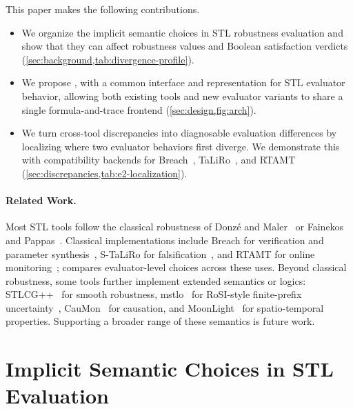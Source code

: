 This paper makes the following contributions.
\begin{itemize}
  \item We organize the implicit semantic choices in STL robustness
    evaluation and show that they can affect robustness values and Boolean satisfaction verdicts (\cref{sec:background,tab:divergence-profile}).
  \item We propose \tool, with a common interface and representation for STL evaluator behavior, allowing both existing tools and new evaluator variants to share a single formula-and-trace frontend (\cref{sec:design,fig:arch}).
  \item We turn cross-tool discrepancies into diagnosable evaluation differences by localizing
  where two evaluator behaviors first diverge.
  We demonstrate this with compatibility backends for Breach~\cite{donze2010breach}, TaLiRo~\cite{annpureddy2011staliro}, and RTAMT~\cite{nickovic2020rtamt}
    (\cref{sec:discrepancies,tab:e2-localization}).
\end{itemize}

\paragraph{Related Work.}
Most STL tools follow the classical robustness of
Donz\'e and Maler~\cite{donze2010robust} or Fainekos and
Pappas~\cite{fainekos2009robustness}. Classical implementations include Breach
for verification and parameter synthesis~\cite{donze2010breach}, S-TaLiRo for
falsification~\cite{annpureddy2011staliro}, and RTAMT for online
monitoring~\cite{nickovic2020rtamt}; \tool compares evaluator-level choices across
these uses. Beyond classical robustness, some
tools further implement extended semantics or logics:
STLCG++~\cite{kapoor2025stlcgpp} for smooth robustness,
mstlo~\cite{thomsen2026mstlo} for RoSI-style finite-prefix
uncertainty~\cite{deshmukh2017online},
CauMon~\cite{CauMon} for causation, and MoonLight~\cite{bartocci2023moonlight}
for spatio-temporal properties. Supporting a broader range of these semantics
is future work.

\section{Implicit Semantic Choices in STL Evaluation}
\label{sec:background}

